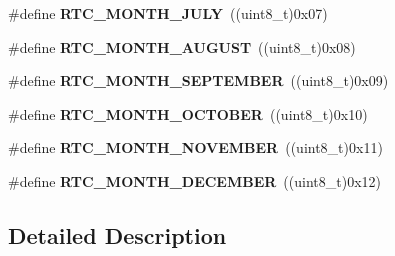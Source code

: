 \begin{DoxyCompactItemize}
\mbox{\label{group___r_t_c___month___date___definitions_gae710e500c34c042a263fcb47edeec29f}} 
\#define {\bfseries R\+T\+C\+\_\+\+M\+O\+N\+T\+H\+\_\+\+J\+U\+LY}~((uint8\+\_\+t)0x07)
\item 
\mbox{\label{group___r_t_c___month___date___definitions_ga4118ea385d30d3f75c2f879faf019f37}} 
\#define {\bfseries R\+T\+C\+\_\+\+M\+O\+N\+T\+H\+\_\+\+A\+U\+G\+U\+ST}~((uint8\+\_\+t)0x08)
\item 
\mbox{\label{group___r_t_c___month___date___definitions_ga2a4d94eeb920cb994cd11e169d086d28}} 
\#define {\bfseries R\+T\+C\+\_\+\+M\+O\+N\+T\+H\+\_\+\+S\+E\+P\+T\+E\+M\+B\+ER}~((uint8\+\_\+t)0x09)
\item 
\mbox{\label{group___r_t_c___month___date___definitions_gab4e8870c5a2fe6fc632d2050d490ef9f}} 
\#define {\bfseries R\+T\+C\+\_\+\+M\+O\+N\+T\+H\+\_\+\+O\+C\+T\+O\+B\+ER}~((uint8\+\_\+t)0x10)
\item 
\mbox{\label{group___r_t_c___month___date___definitions_ga2f04d521214ea447155faff077725212}} 
\#define {\bfseries R\+T\+C\+\_\+\+M\+O\+N\+T\+H\+\_\+\+N\+O\+V\+E\+M\+B\+ER}~((uint8\+\_\+t)0x11)
\item 
\mbox{\label{group___r_t_c___month___date___definitions_gaa2d8ee14bdc0c6b01be7c72b82ae64e5}} 
\#define {\bfseries R\+T\+C\+\_\+\+M\+O\+N\+T\+H\+\_\+\+D\+E\+C\+E\+M\+B\+ER}~((uint8\+\_\+t)0x12)
\end{DoxyCompactItemize}


\subsection{Detailed Description}
